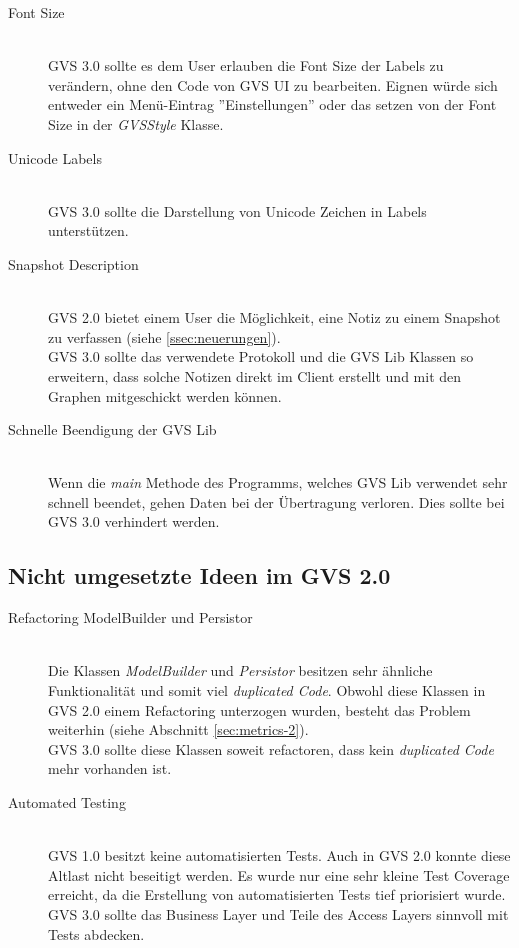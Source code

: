 \documentclass[11pt,a4paper,english,oneside]{book}
\numberwithin{equation}{chapter}
\begin{document}
	\begin{description}
		\item[Font Size] \hfill \\
			GVS 3.0 sollte es dem User erlauben die Font Size der Labels zu verändern, ohne den Code von GVS UI zu bearbeiten. Eignen würde sich entweder ein Menü-Eintrag ''Einstellungen'' oder das setzen von der Font Size in der \textit{GVSStyle} Klasse.
		\item[Unicode Labels] \hfill \\
		GVS 3.0 sollte die Darstellung von Unicode Zeichen in Labels unterstützen.
		\item[Snapshot Description] \hfill \\
			GVS 2.0 bietet einem User die Möglichkeit, eine Notiz zu einem Snapshot zu verfassen (siehe \ref{ssec:neuerungen}).\\
			GVS 3.0 sollte das verwendete Protokoll und die GVS Lib Klassen so erweitern, dass solche Notizen direkt im Client erstellt und mit den Graphen mitgeschickt werden können.
		\item[Schnelle Beendigung der GVS Lib] \hfill \\
			Wenn die \textit{main} Methode des Programms, welches GVS Lib verwendet sehr schnell beendet, gehen Daten bei der Übertragung verloren. Dies sollte bei GVS 3.0 verhindert werden.
	\end{description}
	
	\subsection{Nicht umgesetzte Ideen im GVS 2.0}
	\label{ssec:gvs-todos}
	\begin{description}
		\item[Refactoring ModelBuilder und Persistor] \hfill \\
			Die Klassen \textit{ModelBuilder} und \textit{Persistor} besitzen sehr ähnliche Funktionalität und somit viel \textit{duplicated Code}. Obwohl diese Klassen in GVS 2.0 einem Refactoring unterzogen wurden, besteht das Problem weiterhin (siehe Abschnitt \ref{sec:metrics-2}).\\
			GVS 3.0 sollte diese Klassen soweit refactoren, dass kein \textit{duplicated Code} mehr vorhanden ist.
		\item[Automated Testing] \hfill \\
			GVS 1.0 besitzt keine automatisierten Tests. Auch in GVS 2.0 konnte diese Altlast nicht beseitigt werden. Es wurde nur eine sehr kleine Test Coverage erreicht, da die Erstellung von automatisierten Tests tief priorisiert wurde.\\
			GVS 3.0 sollte das Business Layer und Teile des Access Layers sinnvoll mit Tests abdecken.
	\end{description}
	
\end{document}
